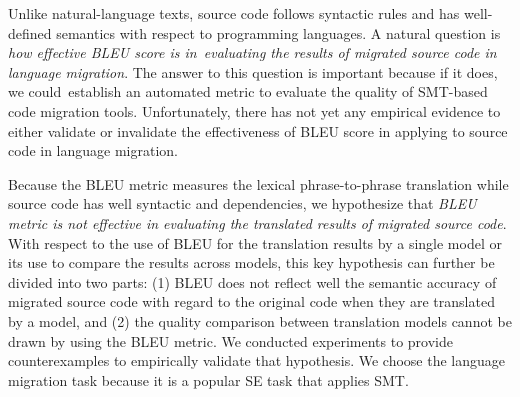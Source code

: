 Unlike natural-language texts, source code follows syntactic rules and
has well-defined semantics with respect to programming languages. A
natural question is {\em how effective BLEU score is in~evaluating the
  results of migrated source code in language migration}. The answer
to this question is important because if it does, we could~establish
an automated metric to evaluate the quality of SMT-based code
migration tools.
Unfortunately, there has not yet
any empirical evidence to either validate or invalidate the
effectiveness of BLEU score in applying to source code in language
migration.

Because the BLEU metric measures the lexical phrase-to-phrase translation
while source code has well syntactic and dependencies, we hypothesize that
{\em BLEU metric is not effective in evaluating the translated results of
migrated source code}. With respect to the use of BLEU
for the translation results by a single model or its use to compare
the results across models, this key hypothesis can further be divided
into two parts: (1) BLEU does not reflect well the semantic accuracy
of migrated source code with regard to the original code when they are
translated by a model, and (2) the quality comparison between translation models cannot be drawn by using the BLEU metric.
%
We conducted experiments to provide counterexamples to empirically
validate that hypothesis. We choose the language migration task
because it is a popular SE task that applies SMT.


